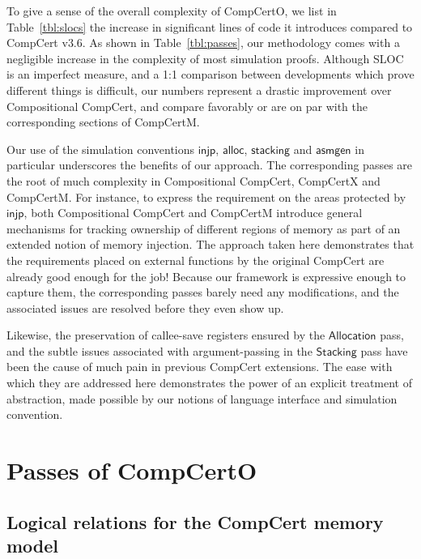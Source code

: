 \documentclass[draft,11pt]{report}
\theoremstyle{definition}
\newcommand{\kw}[1]{\ensuremath{ \mathsf{#1} }}
\begin{document}
To give a sense of the overall complexity of CompCertO,
we list in Table~\ref{tbl:slocs}
the increase in significant lines of code it introduces
compared to CompCert v$3.6$.
As shown in Table~\ref{tbl:passes},
our methodology comes with a negligible increase
in the complexity of most simulation proofs.
Although SLOC is an imperfect measure,
and a 1:1 comparison between developments which
prove different things is difficult,
our numbers represent
a drastic improvement over Compositional CompCert,
and compare favorably
or are on par with
the corresponding sections of CompCertM.

Our use of the simulation conventions
\kw{injp}, \kw{alloc}, \kw{stacking} and \kw{asmgen}
in particular
underscores the benefits of our approach.
The corresponding passes are the root of
much complexity
in Compositional CompCert, CompCertX and CompCertM.
For instance,
to express the requirement on
the areas protected by \kw{injp},
both Compositional CompCert and CompCertM
introduce general mechanisms for tracking ownership of
different regions of memory
as part of an extended notion of memory injection.
The approach taken here demonstrates that
the requirements placed on external functions
by the original CompCert
are already good enough for the job!
Because our framework is expressive enough to capture them,
the corresponding passes barely need any modifications,
and the associated issues are resolved before they even show up.

Likewise, the preservation of callee-save registers
ensured by the \kw{Allocation} pass,
and the subtle issues associated with argument-passing
in the \kw{Stacking} pass
have been the cause of much pain
in previous CompCert extensions.
The ease with which they are addressed here
demonstrates the power of
an explicit treatment of abstraction,
made possible
by our notions of language interface and simulation convention.



\chapter{Passes of CompCertO} %

\section{Logical relations for the CompCert memory model} \label{sec:cklr} %
\end{document}
